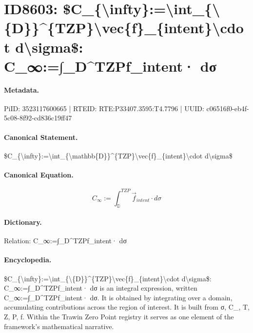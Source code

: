 \section*{ID8603: \$C\_\{\textbackslash{}infty\}:=\textbackslash{}int\_\{\textbackslash{}\{D\}\}\textasciicircum{}\{TZP\}\textbackslash{}vec\{f\}\_\{intent\}\textbackslash{}cdot d\textbackslash{}sigma\$: C\_∞:=∫\_D\textasciicircum{}TZPf\_intent· dσ}
\paragraph{Metadata.}
PiID: 3523117600665 | RTEID: RTE:P33407.3595:T4.7796 | UUID: c06516f0-eb4f-5c08-8f92-cd836c19ff47

\paragraph{Canonical Statement.}
\$C\_\{\textbackslash{}infty\}:=\textbackslash{}int\_\{\textbackslash{}mathbb\{D\}\}\textasciicircum{}\{TZP\}\textbackslash{}vec\{f\}\_\{intent\}\textbackslash{}cdot d\textbackslash{}sigma\$

\paragraph{Canonical Equation.}
\[
C_{\infty}:=\int_{\mathbb{D}}^{TZP}\vec{f}_{intent}\cdot d\sigma
\]

\paragraph{Dictionary.}
Relation: C\_∞:=∫\_D\textasciicircum{}TZPf\_intent· dσ

\paragraph{Encyclopedia.}
\$C\_\{\textbackslash{}infty\}:=\textbackslash{}int\_\{\textbackslash{}\{D\}\}\textasciicircum{}\{TZP\}\textbackslash{}vec\{f\}\_\{intent\}\textbackslash{}cdot d\textbackslash{}sigma\$: C\_∞:=∫\_D\textasciicircum{}TZPf\_intent· dσ is an integral expression, written C\_∞:=∫\_D\textasciicircum{}TZPf\_intent· dσ. It is obtained by integrating over a domain, accumulating contributions across the region of interest. It is built from σ, C\_, T, Z, P, f. Within the Trawin Zero Point registry it serves as one element of the framework's mathematical narrative.
